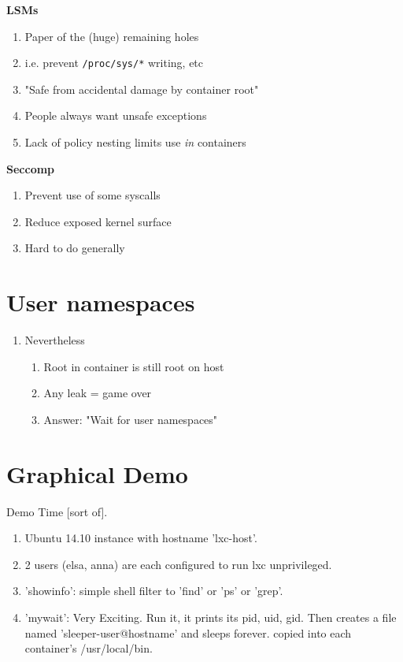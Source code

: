 \documentclass{beamer}
\begin{document}
\begin{frame}
\textbf{LSMs}
\begin{enumerate}
\item Paper of the (huge) remaining holes
\item i.e. prevent {\tt /proc/sys/*} writing, etc
\item "Safe from accidental damage by container root"
\item People always want unsafe exceptions
\item Lack of policy nesting limits use {\em in} containers
\end{enumerate}

\vspace{0.25in}

\textbf{Seccomp}
\begin{enumerate}
\item Prevent use of some syscalls
\item Reduce exposed kernel surface
\item Hard to do generally
\end{enumerate}
\end{frame}

\section{User namespaces}
\begin{frame}
\begin{enumerate}
\item Nevertheless
	\begin{enumerate}
	\item Root in container is still root on host
	\item Any leak = game over
	\item Answer: "Wait for user namespaces"
	\end{enumerate}
\end{enumerate}
\end{frame}

\section{Graphical Demo}
\begin{frame}
Demo Time [sort of].
\begin{enumerate}
   \item Ubuntu 14.10 instance with hostname 'lxc-host'.
   \item 2 users (elsa, anna) are each configured to run lxc unprivileged.
   \item 'showinfo': simple shell filter to 'find' or 'ps' or 'grep'.
   \item 'mywait': Very Exciting. Run it, it prints its pid, uid, gid.  Then creates a file named 'sleeper-user@hostname' and sleeps forever. copied into each container's /usr/local/bin.
\end{enumerate}
\end{frame}
\end{document}

